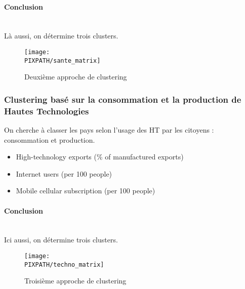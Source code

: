 \paragraph{Conclusion}\hfill\\

Là aussi, on détermine trois clusters.

\begin{sidewaysfigure}[h]
\centering
\caption{Deuxième approche de clustering}
\texttt{[image: \\PIXPATH/sante\_matrix]}
\end{sidewaysfigure}


\subsubsection{Clustering basé sur la consommation et la production de
Hautes Technologies}

On cherche à classer les pays selon l'usage des HT par les citoyens :
consommation et production.

\begin{itemize}
\item High-technology exports (\% of manufactured exports)
\item Internet users (per 100 people)
\item Mobile cellular subscription (per 100 people)
\end{itemize}

\paragraph{Conclusion}\hfill\\

Ici aussi, on détermine trois clusters.

\begin{sidewaysfigure}[h]
\centering
\caption{Troisième approche de clustering}
\texttt{[image: \\PIXPATH/techno\_matrix]}
\end{sidewaysfigure}

